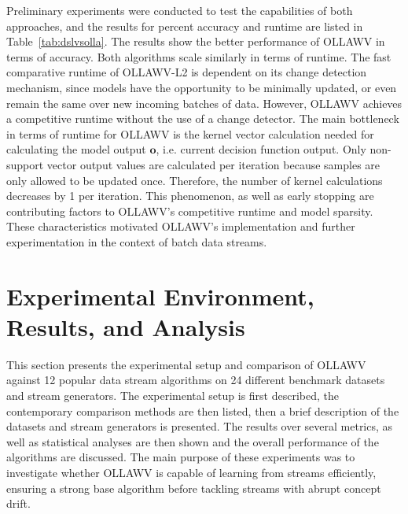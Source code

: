 \documentclass[reqno]{vcuthesis}
\numberwithin{equation}{chapter}
\begin{document}
Preliminary experiments were conducted to test the capabilities of both approaches, and the results for percent accuracy and runtime are listed in Table~\ref{tab:dslvsolla}. The results show the better performance of OLLAWV in terms of accuracy. Both algorithms scale similarly in terms of runtime. The fast comparative runtime of OLLAWV-L2 is dependent on its change detection mechanism, since models have the opportunity to be minimally updated, or even remain the same over new incoming batches of data. However, OLLAWV achieves a competitive runtime without the use of a change detector. The main bottleneck in terms of runtime for OLLAWV is the kernel vector calculation needed for calculating the model output $\bm o$, i.e. current decision function output. Only non-support vector output values are calculated per iteration because samples are only allowed to be updated once. Therefore, the number of kernel calculations decreases by 1 per iteration. This phenomenon, as well as early stopping are contributing factors to OLLAWV's competitive runtime and model sparsity. These characteristics motivated OLLAWV's implementation and further experimentation in the context of batch data streams.

\section{Experimental Environment, Results, and Analysis}
This section presents the experimental setup and comparison of OLLAWV against 12 popular data stream algorithms on 24 different benchmark datasets and stream generators. The experimental setup is first described, the contemporary comparison methods are then listed, then a brief description of the datasets and stream generators is presented. The results over several metrics, as well as statistical analyses are then shown and the overall performance of the algorithms are discussed. The main purpose of these experiments was to investigate whether OLLAWV is capable of learning from streams efficiently, ensuring a strong base algorithm before tackling streams with abrupt concept drift. 
\end{document}

